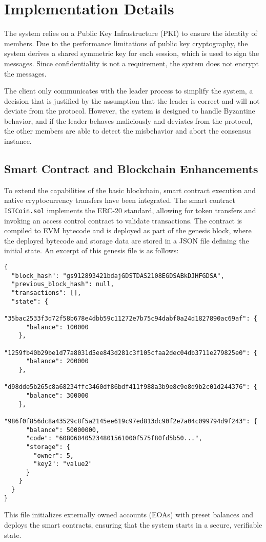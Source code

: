 \documentclass[runningheads]{llncs}
\begin{document}
\section{Implementation Details}
The system relies on a Public Key Infrastructure (PKI) to ensure the identity of members. Due to the performance limitations of public key cryptography, the system derives a shared symmetric key for each session, which is used to sign the messages. Since confidentiality is not a requirement, the system does not encrypt the messages.

The client only communicates with the leader process to simplify the system, a decision that is justified by the assumption that the leader is correct and will not deviate from the protocol. However, the system is designed to handle Byzantine behavior, and if the leader behaves maliciously and deviates from the protocol, the other members are able to detect the misbehavior and abort the consensus instance.

\subsection{Smart Contract and Blockchain Enhancements}
To extend the capabilities of the basic blockchain, smart contract execution and native cryptocurrency transfers have been integrated. The smart contract \texttt{ISTCoin.sol} implements the ERC-20 standard, allowing for token transfers and invoking an access control contract to validate transactions. The contract is compiled to EVM bytecode and is deployed as part of the genesis block, where the deployed bytecode and storage data are stored in a JSON file defining the initial state. An excerpt of this genesis file is as follows:
\begin{verbatim}
{
  "block_hash": "gs912893421bdajGDSTDAS2108EGDSABkDJHFGDSA",
  "previous_block_hash": null,
  "transactions": [],
  "state": {
    "35bac2533f3d72f58b678e4dbb59c11272e7b75c94dabf0a24d1827890ac69af": { 
      "balance": 100000
    },
    "1259fb40b29be1d77a8031d5ee843d281c3f105cfaa2dec04db3711e279825e0": {
      "balance": 200000
    },
    "d98dde5b265c8a68234ffc3460df86bdf411f988a3b9e8c9e8d9b2c01d244376": {
      "balance": 300000
    },
    "986f0f856dc8a43529c8f5a2145ee619c97ed813dc90f2e7a04c099794d9f243": {
      "balance": 50000000,
      "code": "608060405234801561000f575f80fd5b50...",
      "storage": {
        "owner": 5,
        "key2": "value2"
      }
    }
  }
}
\end{verbatim}
This file initializes externally owned accounts (EOAs) with preset balances and deploys the smart contracts, ensuring that the system starts in a secure, verifiable state.
\end{document}
